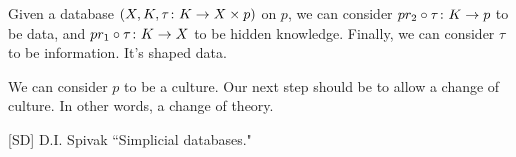 \documentclass{amsart}
\begin{document}
Given a database $(X,K,\tau\colon K\rightarrow X\times p)$ on $p$, we can consider $pr_2\circ\tau\colon K\rightarrow p$ to be data, and $pr_1\circ\tau\colon K\rightarrow X$ to be hidden knowledge.  Finally, we can consider $\tau$ to be information.  It's shaped data.  

We can consider $p$ to be a culture.  Our next step should be to allow a change of culture.  In other words, a change of theory.


\begin{thebibliography}{JTT}

[SD] D.I. Spivak ``Simplicial databases."

\end{thebibliography}
\end{document}
